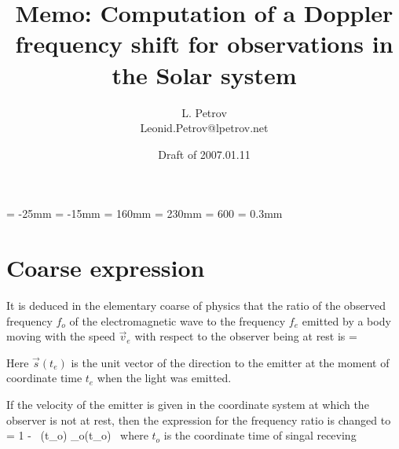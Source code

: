 
\newcommand{\pid}   {\par\hangindent=2em\hangafter=-9\noindent}
\newcommand{\ppid}  {\par\hangindent=4em\hangafter=-9\noindent}
\newcommand{\pppid} {\par\hangindent=6em\hangafter=-9\noindent}
\newcommand{\ppppid}{\par\hangindent=8em\hangafter=-9\noindent}
\renewcommand{\epsilon}{\varepsilon}
\renewcommand{\phi}{\varphi}
\newcommand{\dint}{\int\hspace{-0.25em}\int}
\newcommand{\hh}{\hphantom}
\newcommand{\hpp}{\hphantom+}
\newcommand{\vex}{\vspace{1ex}}
\newcommand{\den}{\Frac{1}{c}\Frac{1}{1 + \Frac{1}{c}\lp \vec{V_{\earth}}(t_1)\, + \dmat{E}(e(t_1))\,\vec{r}_2\rp} }

\voffset    = -25mm
\hoffset    = -15mm
\textwidth  = 160mm
\textheight = 230mm
\tolerance  = 600
\hfuzz      = 0.3mm

\title {  \LARGE\bf Memo: Computation of a Doppler frequency shift for
                          observations in the Solar system}
\author{ {\large\sc L. Petrov} \\
         {\small Leonid.Petrov@lpetrov.net }
       }
\date{Draft of 2007.01.11}




\maketitle

\section{Coarse expression}

  It is deduced in the elementary coarse of physics that the ratio of the
observed frequency $f_o$ of the electromagnetic wave to the frequency 
$f_e$ emitted by a body moving with the speed $\vec{v}_e$ with respect to the 
observer being at rest is
%
\beq
      = 
                {  }

  Here $\vec{s}(t_e)$ is the unit vector of the direction to the emitter at the
moment of coordinate time $t_e$ when the light was emitted.

  If the velocity of the emitter is given in the coordinate system at which
the observer is not at rest, then the expression for the frequency ratio 
is changed to 
%
\beq
      = 
                {1 -  \, (t_o) \cdot {}_o(t_o)}
           \, 
                {}
%
  where $t_o$ is the coordinate time of singal receving

